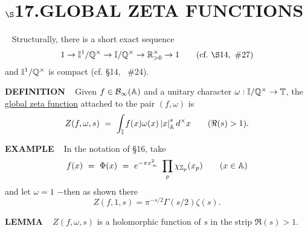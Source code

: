 \chapter{
$\boldsymbol{\S}$\textbf{17}.\quad  GLOBAL ZETA FUNCTIONS}
\setlength\parindent{2em}
\setcounter{theoremn}{0}

\ \indent 
Structurally, there is a short exact sequence
\[
1 \ra \I^1/ \Q^\times \ra \I/ \Q^\times \ra \R_{>0}^\times \ra 1 	\qquad 
(\text{cf.} \  \S14, \ \#27)
\]
and $\mathbb{I}^1/ \mathbb{Q}^\times$ is compact (cf. \S14, \ \#24).

\vspace{0.3cm}

\begin{x}{\small\bf DEFINITION} \ %
Given $f \in \mathcal{B}_\infty(\mathbb{A})$ and a unitary character $\omega:\mathbb{I}/ \mathbb{Q}^\times \rightarrow \mathbb{T}$, the 
\underline{global zeta function}
attached to the pair $(f,\omega)$ is 
\[
Z (f,\omega,s) \ =\  \int_{\mathbb{I}} f(x)\omega(x)\left\vert x\right\vert_{\mathbb{A}}^s d^\times x		\qquad (\Re(s) > 1).
\]
\end{x}

\vspace{0.1cm}

\begin{x}{\small\bf EXAMPLE} \ %
In the notation of \S16, take
\[
f(x) \ = \ \Phi(x) \ = \ e^{-\pi x_\infty ^2} \ \prod_p \chi_{\mathbb{Z}_p} (x_p)		\qquad (x \in \mathbb{A})
\]
and let $\omega = 1$ $-$then as shown there
\[
Z(f,1,s) = \pi ^{-s/2} \Gamma(s/2) \zeta(s).
\]
\end{x}

\vspace{0.1cm}

\begin{x}{\small\bf LEMMA} \ %
$Z(f,\omega,s)$ is a holomorphic function of $s$ in the strip $\Re(s) > 1.$
\end{x}

\vspace{0.1cm}

